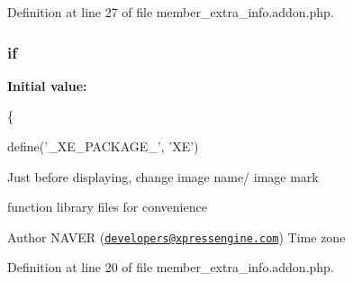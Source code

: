 Definition at line 27 of file member\-\_\-extra\-\_\-info.\-addon.\-php.

\hypertarget{member__extra__info_8addon_8php_afea24ae1a19d6cc573dc578087a6b3e6}{
\subsubsection[{if}]{\setlength{\rightskip}{0pt plus 5cm}if}}\label{member__extra__info_8addon_8php_afea24ae1a19d6cc573dc578087a6b3e6}
{\bfseries Initial value\-:}
\begin{DoxyCode}
\{
    
    define(\textcolor{stringliteral}{'\_XE\_PACKAGE\_'}, \textcolor{stringliteral}{'XE'})
\end{DoxyCode}
Just before displaying, change image name/ image mark

function library files for convenience

\begin{DoxyAuthor}{Author}
N\-A\-V\-E\-R (\href{mailto:developers@xpressengine.com}{\tt developers@xpressengine.\-com}) Time zone 
\end{DoxyAuthor}


Definition at line 20 of file member\-\_\-extra\-\_\-info.\-addon.\-php.

